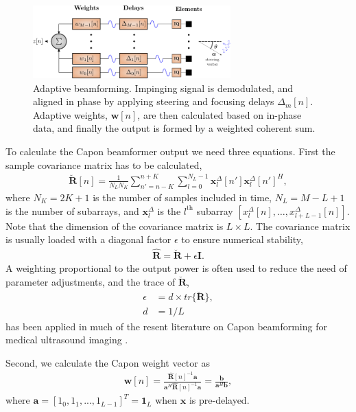 \documentclass[conference]{IEEEtran}
\newcommand{\mat}[1]{\mathbf{#1}}
\renewcommand{\vec}[1]{\mathbf{#1}}
\begin{document}
\begin{figure}
\centerline{\includegraphics[width=3in]{gfx/beamforming_mv_lowres.png}}
\caption{Adaptive beamforming. Impinging signal is demodulated, and aligned in phase by applying steering and focusing delays $\Delta_m[n]$. Adaptive weights, $\vec{w}[n]$, are then calculated based on in-phase data, and finally the output is formed by a weighted coherent sum.}
\label{fig:mvbf}
\end{figure}

To calculate the Capon beamformer output we need three equations. First the sample covariance matrix has to be calculated,
\begin{align}
\mat{\breve{R}}[n] = \frac{1}{N_LN_K}\sum_{n'=n-K}^{n+K} \sum_{l=0}^{N_L-1} \vec{x}_l^{\Delta}[n']\vec{x}_l^{\Delta}[n']^H,\label{eq:R}
\end{align}
where  $N_K = 2K + 1$ is the number of samples included in time, $N_L = M-L+1$ is the number of subarrays, and $\vec{x}_l^{\Delta}$ is the $l^\text{th}$ subarray $[x_l^{\Delta}[n], \dotso, x_{l+L-1}^{\Delta}[n]]$. Note that the dimension of the covariance matrix is $L \times L$. The covariance matrix is usually loaded with a diagonal factor $\epsilon$ to ensure numerical stability, 
\begin{align}\label{eq:diag}
\mat{\hat{R}} = \mat{\breve{R}} + \epsilon\mat{I}.
\end{align}
A weighting proportional to the output power is often used to reduce the need of parameter adjustments, and the trace of $\mat{\breve{R}}$, 
\begin{align}\label{eq:diag_adapt}
\epsilon &= d \times tr\{\mat{\breve{R}}\}, \\
d &= 1/L
\end{align}
has been applied in much of the resent literature on Capon beamforming for medical ultrasound imaging \cite{Synnevag2007, Mehdizadeh2012}.

Second, we calculate the Capon weight vector as
\begin{align}\label{eq:w}
\vec{w}[n] = \frac{\mat{\hat{R}}[n]^{-1}\vec{a}}{\vec{a}^H\mat{\hat{R}}[n]^{-1}\vec{a}} = \frac{\vec{b}}{\vec{a}^H\vec{b}},
\end{align}
where $\vec{a} = [1_0, 1_1, ..., 1_{L-1}]^T = \vec{1}_L$ when $\vec{x}$ is pre-delayed. 
\end{document}
